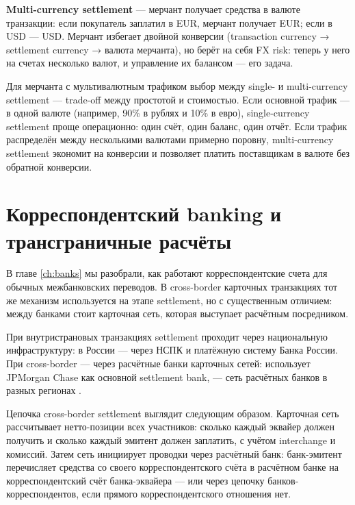 \textbf{Multi-currency settlement} — мерчант получает средства
в валюте транзакции: если покупатель заплатил в EUR, мерчант
получает EUR; если в USD — USD. Мерчант избегает двойной
конверсии (transaction currency → settlement currency →
валюта мерчанта), но берёт на себя FX risk: теперь у него
на счетах несколько валют, и управление их балансом —
его задача.

\begin{kaobox}[title=На практике]
  Для мерчанта с мультивалютным трафиком выбор между single-
  и multi-currency settlement — trade-off между простотой
  и стоимостью. Если основной трафик — в одной валюте
  (например, 90\% в рублях и 10\% в евро), single-currency
  settlement проще операционно: один счёт, один баланс,
  один отчёт. Если трафик распределён между несколькими
  валютами примерно поровну, multi-currency settlement
  экономит на конверсии и позволяет платить поставщикам
  в валюте без обратной конверсии.
\end{kaobox}

\section{Корреспондентский banking и трансграничные расчёты}
\label{sec:mc-correspondent}

В главе \ref{ch:banks} мы разобрали, как работают
корреспондентские счета для обычных межбанковских переводов.
В cross-border карточных транзакциях тот же механизм
используется на этапе settlement, но с существенным отличием:
между банками стоит карточная сеть, которая выступает
расчётным посредником.

При внутристрановых транзакциях settlement проходит через
национальную инфраструктуру: в России — через НСПК
и платёжную систему Банка России. При cross-border —
через расчётные банки карточных сетей: 
использует JPMorgan Chase как основной settlement bank,
 — сеть расчётных банков
в разных регионах .

Цепочка cross-border settlement выглядит следующим образом.
Карточная сеть рассчитывает нетто-позиции всех участников:
сколько каждый эквайер должен получить и сколько каждый
эмитент должен заплатить, с учётом interchange и комиссий.
Затем сеть инициирует проводки через расчётный банк:
банк-эмитент перечисляет средства со своего корреспондентского
счёта в расчётном банке на корреспондентский счёт
банка-эквайера — или через цепочку банков-корреспондентов,
если прямого корреспондентского отношения нет.

